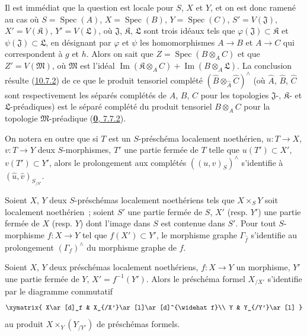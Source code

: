Il est immédiat que la question est locale pour $S$, $X$ et $Y$, et on
est donc ramené au cas où $S=\operatorname{Spec}(A)$,
$X=\operatorname{Spec}(B)$, $Y=\operatorname{Spec}(C)$,
$S'=V(\mathfrak{J})$, $X'=V(\mathfrak{K})$, $Y'=V(\mathfrak{L})$, où
$\mathfrak{J}$, $\mathfrak{K}$, $\mathfrak{L}$ sont trois idéaux tels
que $\varphi(\mathfrak{J})\subset\mathfrak{K}$ et
$\psi(\mathfrak{J})\subset\mathfrak{L}$, en désignant par $\varphi$ et
$\psi$ les homomorphismes $A\to B$ et $A\to C$ qui correspondent à $g$
et $h$. Alors on sait que $Z=\operatorname{Spec}(B\otimes_A C)$ et que
$Z'=V(\mathfrak{M})$, où $\mathfrak{M}$ est l'idéal
$\operatorname{Im}(\mathfrak{K}\otimes_A C)
+\operatorname{Im}(B\otimes_A\mathfrak{L})$. La conclusion résulte
(\hyperref[I.10.7.2-fr]{10.7.2}) de ce que le produit tensoriel complété
$(\widehat B\otimes_{\widehat A}\widehat C)^\wedge$ (où $\widehat A$,
$\widehat B$, $\widehat C$ sont respectivement les séparés complétés de
$A$, $B$, $C$ pour les topologies $\mathfrak{J}$-, $\mathfrak{K}$- et
$\mathfrak{L}$-préadiques) est le séparé complété du produit tensoriel
$B\otimes_A C$ pour la topologie $\mathfrak{M}$-préadique
(\hyperref[0.7.7.2-fr]{\textbf{0}, 7.7.2}).

On notera en outre que si $T$ est un $S$-préschéma localement
noethérien, $u:T\to X$, $v:T\to Y$ deux $S$-morphismes, $T'$ une partie
fermée de $T$ telle que $u(T')\subset X'$, $v(T')\subset Y'$, alors le
prolongement aux complétés $((u,v)_S)^\wedge$ s'identifie à
$(\widehat u,\widehat v)_{S_{/S'}}$.

\begin{corollary}[10.9.8]
\label{I.10.9.8-fr}
Soient $X$, $Y$ deux $S$-préschémas localement noethériens tels que
$X\times_S Y$ soit localement noethérien~; soient $S'$ une partie fermée
de $S$, $X'$ \textup{(resp. $Y'$)} une partie fermée de $X$ \textup{(resp. $Y$)} dont
l'image dans $S$ est contenue dans $S'$. Pour tout $S$-morphisme
$f:X\to Y$ tel que $f(X')\subset Y'$, le morphisme graphe
$\Gamma_{\widehat f}$ s'identifie au prolongement $(\Gamma_f)^\wedge$ du
morphisme graphe de $f$.
\end{corollary}

\begin{corollary}[10.9.9]
\label{I.10.9.9-fr}
Soient $X$, $Y$ deux préschémas localement noethériens, $f:X\to Y$ un
morphisme, $Y'$ une partie fermée de $Y$, $X'=f^{-1}(Y')$. Alors le
préschéma formel $X_{/X'}$ s'identifie par le diagramme commutatif
\[
  \label{I.10.9.9.1-fr}
  \xymatrix{
    X\ar[d]_f &
    X_{/X'}\ar[l]\ar[d]^{\widehat f}\\
    Y &
    Y_{/Y'}\ar[l]
  }
\]
au produit $X\times_Y(Y_{/Y'})$ de préschémas formels.
\end{corollary}

